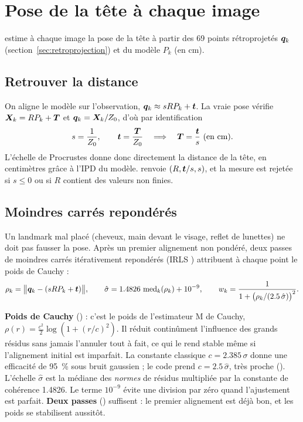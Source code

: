 \section{Pose de la tête à chaque image}
\label{sec:pose}

 estime à chaque image la pose de la tête à partir des 69 points rétroprojetés $\bm{q}_k$ (section~\ref{sec:retroprojection}) et du modèle $P_k$ (en cm).

\subsection{Retrouver la distance}

On aligne le modèle sur l'observation, $\bm{q}_k \approx s R P_k + \bm{t}$. La vraie pose vérifie $\bm{X}_k = R P_k + \bm{T}$ et $\bm{q}_k = \bm{X}_k / Z_0$, d'où par identification
\begin{equation}
  s = \frac{1}{Z_0}, \qquad \bm{t} = \frac{\bm{T}}{Z_0} \quad\Longrightarrow\quad \bm{T} = \frac{\bm{t}}{s} \ \text{(en cm)}.
\end{equation}
L'échelle de Procrustes donne donc directement la distance de la tête, en centimètres grâce à l'IPD du modèle.  renvoie $(R, \bm{t}/s, s)$, et la mesure est rejetée si $s \leq 0$ ou si $R$ contient des valeurs non finies.

\subsection{Moindres carrés repondérés}

Un landmark mal placé (cheveux, main devant le visage, reflet de lunettes) ne doit pas fausser la pose. Après un premier alignement non pondéré, deux passes de moindres carrés itérativement repondérés (IRLS \cite{holland1977}) attribuent à chaque point le poids de Cauchy :
\begin{equation}
  \rho_k = \big\|\bm{q}_k - (sRP_k + \bm{t})\big\|, \qquad
  \hat\sigma = \num{1.4826}\,\operatorname{med}_k(\rho_k) + 10^{-9}, \qquad
  w_k = \frac{1}{1 + \big(\rho_k / (\num{2.5}\,\hat\sigma)\big)^2} .
\end{equation}

\begin{origine}
\textbf{Poids de Cauchy} (\litt) : c'est le poids de l'estimateur M de Cauchy, $\rho(r) = \tfrac{c^2}{2}\log(1 + (r/c)^2)$. Il réduit continûment l'influence des grands résidus sans jamais l'annuler tout à fait, ce qui le rend stable même si l'alignement initial est imparfait. La constante classique $c = \num{2.385}\,\sigma$ donne une efficacité de \qty{95}{\percent} sous bruit gaussien \cite{holland1977} ; le code prend $c = \num{2.5}\,\hat\sigma$, très proche (\empi). L'échelle $\hat\sigma$ est la médiane des \emph{normes} de résidus multipliée par la constante de cohérence \num{1.4826}. Le terme $10^{-9}$ évite une division par zéro quand l'ajustement est parfait. \textbf{Deux passes} (\empi) suffisent : le premier alignement est déjà bon, et les poids se stabilisent aussitôt.
\end{origine}


